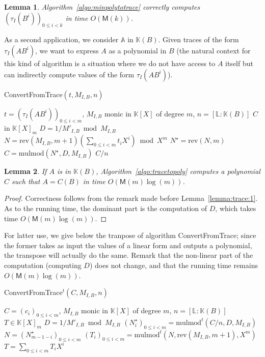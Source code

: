 \documentclass[12pt]{article}
\def\M {\ensuremath{\mathsf{M}}}
\def\K {\ensuremath{\mathbb{K}}}
\def\L {\ensuremath{\mathbb{L}}}
\def\A {\ensuremath{\mathbb{A}}}
\def\mulmod {\ensuremath{\mathrm{mulmod}}}
\def\rev {\ensuremath{\mathrm{rev}}}
\newtheorem{Lemma}{Lemma}
\begin{document}
\begin{Lemma}\label{lemma:computetrace}
  Algorithm~\ref{algo:minpolytotrace} correctly computes
  $(\tau_I(B^i))_{0 \le i < k}$ in time $O(\M(k))$.
\end{Lemma}

As a second application, we consider $\A$ in $\K(B)$. Given traces of
the form $\tau_I(A B^i)$, we want to express $A$ as a polynomial in
$B$ (the natural context for this kind of algorithm is a situation
where we do not have access to $A$ itself but can indirectly compute
values of the form $\tau_I(A B^i)$).

\begin{algorithm}[H]
  \caption{ConvertFromTrace$(t, M_{I,B}, n)$}
  \begin{algorithmic}[1]
    \REQUIRE  $t=(\tau_I(A B^i))_{0 \le i < m}$, $M_{I,B}$ monic in $\K[X]$ of degree $m$, $n=[\L:\K(B)]$
    \ENSURE $C$ in $\K[X]_m$
    \STATE $D =  1/M'_{I,B} \bmod M_{I,B}$
    \STATE $N=\rev(M_{I,B}, m+1)( \sum_{0 \le i <m} t_i X^i) \bmod X^m$
    \STATE $N^\star = \rev(N, m)$
    \STATE $C=\mulmod(N^\star, D, M_{I,B})$
    \RETURN $C/n$
  \end{algorithmic}
  \label{algo:tracetopoly}
\end{algorithm}

\begin{Lemma}
  If $A$ is in $\K(B)$, Algorithm~\ref{algo:tracetopoly} computes a
  polynomial $C$ such that $A=C(B)$ in time $O(\M(m)\log(m))$.
\end{Lemma}
\begin{proof}
  Correctness follows from the remark made before
  Lemma~\ref{lemma:trace:1}.  As to the running time, the dominant
  part is the computation of $D$, which takes time $O(\M(m)\log(m))$.
\end{proof}

For latter use, we give below the tranpose of algorithm
ConvertFromTrace; since the former takes as input the values of a
linear form and outputs a polynomial, the transpose will actually 
do the same. Remark that the non-linear part of the computation 
(computing $D$) does not change, and that the running time remains 
 $O(\M(m)\log(m))$.

\begin{algorithm}[H]
  \caption{ConvertFromTrace$^t(C,M_{I,B},n)$}
  \begin{algorithmic}[1]
   \REQUIRE $C=(c_i)_{0 \le i <m}$, $M_{I,B}$ monic in $\K[X]$ of degree $m$, $n=[\L:\K(B)]$
   \ENSURE  $T \in \K[X]_m$
    \STATE $D =  1/M'_{I,B} \bmod M_{I,B}$
    \STATE $(N^\star_i)_{0 \le i < m}=\mulmod^t(C/n, D, M_{I,B})$
    \STATE $N = (N^\star_{m-1-i})_{0 \le i < m}$
    \STATE $(T_i)_{0 \le i < m}=\mulmod^t(N, \rev(M_{I,B},m+1), X^m)$
    \RETURN $T=\sum_{0 \le i < m} T_i X^i$
  \end{algorithmic}
\end{algorithm}
\end{document}
